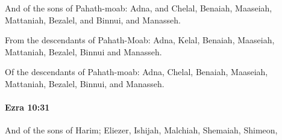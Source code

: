 			\begin{versebox}
					\item[BHS] 
					\item[LXX] 
					\item[ASV] And of the sons of Pahath-moab: Adna, and Chelal, Benaiah, Maaseiah, Mattaniah, Bezalel, and Binnui, and Manasseh.
					\item[NIV] From the descendants of Pahath-Moab: Adna, Kelal, Benaiah, Maaseiah, Mattaniah, Bezalel, Binnui and Manasseh.
					\item[NRSV] Of the descendants of Pahath-moab: Adna, Chelal, Benaiah, Maaseiah, Mattaniah, Bezalel, Binnui, and Manasseh.
			\end{versebox}

		\paragraph{Ezra 10:31} %
			\label{EZRA-10-31}

			And of the sons of Harim; Eliezer, Ishijah, Malchiah, Shemaiah, Shimeon,


